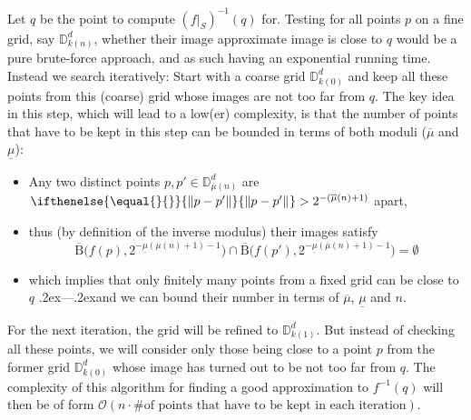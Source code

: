 \documentclass{CSML}
\let\originalleft\left
\let\originalright\right
\renewcommand{\left}{\mathopen{}\mathclose\bgroup\originalleft}
\renewcommand{\right}{\aftergroup\egroup\originalright}
\newcommand{\representation}[2]{ #1\ifnotempty{#2}{^{(#2)}} }
\newcommand{\ID}{\mathbb{D}}
\newcommand{\dom}{\mathrm{dom}} %
\newcommand{\bigO}{\mathcal{O}}
\newcommand{\modcont}{\overline{\mu}}
\newcommand{\modsu}{\underline{\mu}}
\newcommand{\gridrep}[1][\empty]{ \representation{\bm{\kappa}}{#1} }
\newcommand{\norm}[2][\empty]{
   \ifthenelse{\equal{#1}{\empty}}{%
      \left\|#2\right\|
   }{%
      \left\|#2\right\|_{#1}
   }
}
\newcommand{\ifnotempty}[2]{ \ifthenelse{ \equal{#1}{\empty} }{}{#2} }
\newcommand{\ball}{\mathrm{B}}
\newcommand{\cls}[1]{\overline{#1}}
\newcommand{\cball}{\cls{\ball}}
\newcommand{\dfeq}{\coloneqq}
\newcommand{\emdash}{\leavevmode\unskip\kern.2ex---\kern.2ex\ignorespaces}
\begin{document}
Let $q$ be the point to compute
$(f|_S)^{-1}(q)$ for. Testing for all points $p$ on a fine grid, say
$\ID^d_{k(n)}$, whether their image approximate image is close to $q$ would be
a pure brute-force approach, and as such having an exponential running time.
Instead we search iteratively:
Start with a coarse grid $\ID^d_{k(0)}$ and keep
all these points from this (coarse) grid whose images are not too far from $q$.
The key idea in this step, which will lead to a low(er) complexity, is that
the number of points that have to be kept in this step can be bounded in terms
of both moduli ($\modcont$ and $\modsu$):
\begin{itemize}
	\item Any two distinct points $p,p' \in \ID^d_{\modcont(n)}$ are
		$\norm{p - p'} > 2^{-(\modcont(n) + 1)}$ apart,
	\item thus (by definition of the inverse modulus) their images satisfy
		\[
			\cball\big( f(p), 2^{-\modsu(\modcont(n)+1)-1} \big) \cap
			\cball\big( f(p'), 2^{-\modsu(\modcont(n)+1)-1} \big) = \emptyset
		\]
	\item which implies that only finitely many points from a fixed grid can
		be close to $q$ \emdash and we can bound their number in terms of
		$\modcont$, $\modsu$ and $n$.
\end{itemize}
For the next iteration, the grid will be refined to $\ID^d_{k(1)}$. But
instead of checking all these points, we will consider only those being close
to a point $p$ from the former grid $\ID^d_{k(0)}$ whose image has turned out
to be not too far from $q$. The complexity of this algorithm for finding a
good approximation to $f^{-1}(q)$ will then be of form
$\bigO(n \cdot \#\text{of points that have to be kept in each iteration})$.

\end{document}
